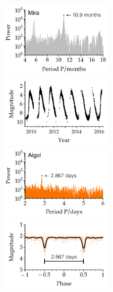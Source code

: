 \begin{figure}[p] 
    \centering

    \includegraphics[width=0.5\textwidth]{figs/pgrams/mira_pgram.pdf}%
    \includegraphics[width=0.5\textwidth]{figs/pgrams/mira_lc.pdf}\\
    \vspace*{0.4cm}
    \includegraphics[width=0.5\textwidth]{figs/pgrams/algol_pgram.pdf}%
    \includegraphics[width=0.5\textwidth]{figs/pgrams/algol_phased.pdf}\\

\end{figure}
